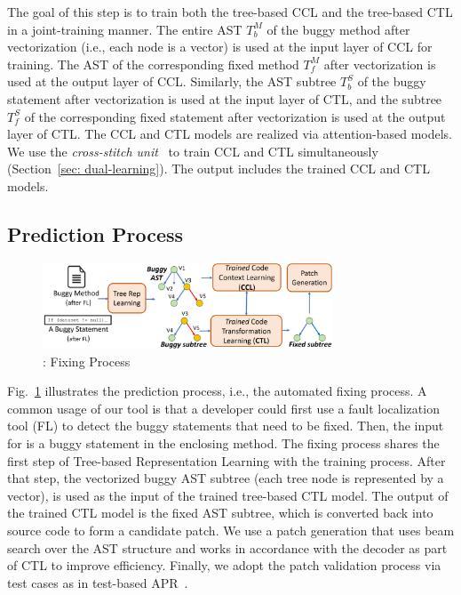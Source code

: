 \vspace{2pt}
  The goal of this step is to train both the tree-based CCL
and the tree-based CTL in a joint-training manner. The entire AST
$T^{M}_b$ of the buggy method after vectorization (i.e., each node is
a vector) is used at the input layer of CCL for training. The AST of
the corresponding fixed method $T^{M}_f$ after vectorization is used
at the output layer of CCL. Similarly, the AST subtree
$T^{S}_b$ of the buggy statement after vectorization is used at the
input layer of CTL, and the subtree $T^{S}_f$ of the corresponding
fixed statement after vectorization is used at the output layer of
CTL. The CCL and CTL models are realized via attention-based
 models. We use the {\em cross-stitch
  unit}~\cite{misra2016cross} to train CCL and CTL simultaneously
(Section~\ref{sec: dual-learning}).
The output includes the trained CCL and CTL models.

\subsection{Prediction Process}

\begin{figure}[t]
	\centering
	\includegraphics[width=3.4in]{graphs/overview-predict-3.png}
	\caption{{\tool}: Fixing Process}
        \vspace{-3pt}
	\label{overview-fixing}
\end{figure}

Fig.~\ref{overview-fixing} illustrates the prediction process, i.e.,
the automated fixing process. A common usage of our tool is that
a developer could first use a fault localization tool
(FL) to detect the buggy statements that need to be fixed. Then, the
input for {\tool} is a buggy statement in the enclosing method.
The fixing process shares the first step of Tree-based Representation
Learning with the training process. After that step, the vectorized
buggy AST subtree (each tree node is represented by a vector), is used
as the input of the trained tree-based CTL model. The output of the
trained CTL model is the fixed AST subtree, which is converted back
into source code to form a candidate patch. We use a patch
generation that uses beam search over the AST structure and works in
accordance with the decoder as part of CTL to improve
efficiency. Finally, we adopt the patch validation process via test
cases as in test-based APR~\cite{icse20}.




